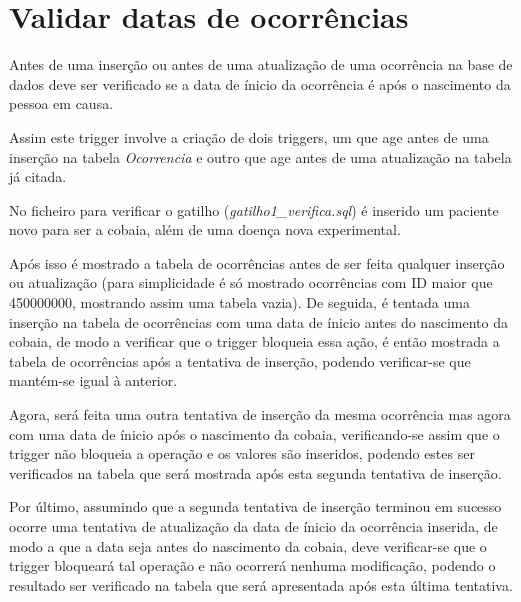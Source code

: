 \documentclass[article, a4paper, 12pt, oneside]{memoir}
\begin{document}
\section{Validar datas de ocorrências}
Antes de uma inserção ou antes de uma atualização de uma ocorrência na base de dados deve ser verificado se a data de ínicio da ocorrência é após o nascimento da pessoa em causa.

Assim este trigger involve a criação de dois triggers, um que age antes de uma inserção na tabela \emph{Ocorrencia} e outro que age antes de uma atualização na tabela já citada.

No ficheiro para verificar o gatilho (\textit{gatilho1\_verifica.sql}) é inserido um paciente novo para ser a cobaia, além de uma doença nova experimental.

Após isso é mostrado a tabela de ocorrências antes de ser feita qualquer inserção ou atualização (para simplicidade é só mostrado ocorrências com ID maior que 450000000, mostrando assim uma tabela vazia). De seguida, é tentada uma inserção na tabela de ocorrências com uma data de ínicio antes do nascimento da cobaia, de modo a verificar que o trigger bloqueia essa ação, é então mostrada a tabela de ocorrências após a tentativa de inserção, podendo verificar-se que mantém-se igual à anterior.

Agora, será feita uma outra tentativa de inserção da mesma ocorrência mas agora com uma data de ínicio após o nascimento da cobaia, verificando-se assim que o trigger não bloqueia a operação e os valores são inseridos, podendo estes ser verificados na tabela que será mostrada após esta segunda tentativa de inserção.

Por último, assumindo que a segunda tentativa de inserção terminou em sucesso ocorre uma tentativa de atualização da data de ínicio da ocorrência inserida, de modo a que a data seja antes do nascimento da cobaia, deve verificar-se que o trigger bloqueará tal operação e não ocorrerá nenhuma modificação, podendo o resultado ser verificado na tabela que será apresentada após esta última tentativa.
\end{document}
